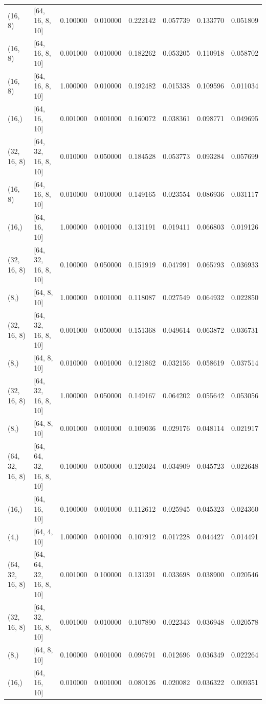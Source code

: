 \begin{tabular}{llrrrrrr}
(16, 8) & [64, 16, 8, 10] & 0.100000 & 0.010000 & 0.222142 & 0.057739 & 0.133770 & 0.051809 \\
(16, 8) & [64, 16, 8, 10] & 0.001000 & 0.010000 & 0.182262 & 0.053205 & 0.110918 & 0.058702 \\
(16, 8) & [64, 16, 8, 10] & 1.000000 & 0.010000 & 0.192482 & 0.015338 & 0.109596 & 0.011034 \\
(16,) & [64, 16, 10] & 0.001000 & 0.001000 & 0.160072 & 0.038361 & 0.098771 & 0.049695 \\
(32, 16, 8) & [64, 32, 16, 8, 10] & 0.010000 & 0.050000 & 0.184528 & 0.053773 & 0.093284 & 0.057699 \\
(16, 8) & [64, 16, 8, 10] & 0.010000 & 0.010000 & 0.149165 & 0.023554 & 0.086936 & 0.031117 \\
(16,) & [64, 16, 10] & 1.000000 & 0.001000 & 0.131191 & 0.019411 & 0.066803 & 0.019126 \\
(32, 16, 8) & [64, 32, 16, 8, 10] & 0.100000 & 0.050000 & 0.151919 & 0.047991 & 0.065793 & 0.036933 \\
(8,) & [64, 8, 10] & 1.000000 & 0.001000 & 0.118087 & 0.027549 & 0.064932 & 0.022850 \\
(32, 16, 8) & [64, 32, 16, 8, 10] & 0.001000 & 0.050000 & 0.151368 & 0.049614 & 0.063872 & 0.036731 \\
(8,) & [64, 8, 10] & 0.010000 & 0.001000 & 0.121862 & 0.032156 & 0.058619 & 0.037514 \\
(32, 16, 8) & [64, 32, 16, 8, 10] & 1.000000 & 0.050000 & 0.149167 & 0.064202 & 0.055642 & 0.053056 \\
(8,) & [64, 8, 10] & 0.001000 & 0.001000 & 0.109036 & 0.029176 & 0.048114 & 0.021917 \\
(64, 32, 16, 8) & [64, 64, 32, 16, 8, 10] & 0.100000 & 0.050000 & 0.126024 & 0.034909 & 0.045723 & 0.022648 \\
(16,) & [64, 16, 10] & 0.100000 & 0.001000 & 0.112612 & 0.025945 & 0.045323 & 0.024360 \\
(4,) & [64, 4, 10] & 1.000000 & 0.001000 & 0.107912 & 0.017228 & 0.044427 & 0.014491 \\
(64, 32, 16, 8) & [64, 64, 32, 16, 8, 10] & 0.001000 & 0.100000 & 0.131391 & 0.033698 & 0.038900 & 0.020546 \\
(32, 16, 8) & [64, 32, 16, 8, 10] & 0.001000 & 0.010000 & 0.107890 & 0.022343 & 0.036948 & 0.020578 \\
(8,) & [64, 8, 10] & 0.100000 & 0.001000 & 0.096791 & 0.012696 & 0.036349 & 0.022264 \\
(16,) & [64, 16, 10] & 0.010000 & 0.001000 & 0.080126 & 0.020082 & 0.036322 & 0.009351 \\

\end{tabular}
